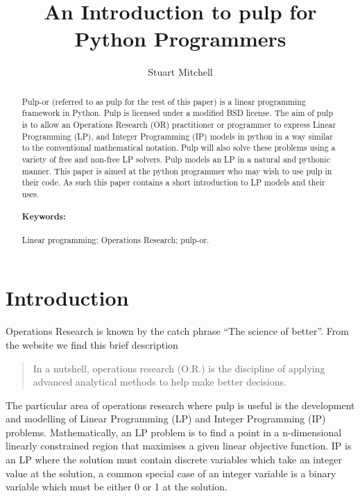 \documentclass[a4paper,oneside]{arlimsTPPM}
\title{An Introduction to pulp for Python Programmers}
\author{Stuart Mitchell}
\institute{
\begin{minipage}[t]{.45\textwidth}\centering
Light Metals Research Centre\\
University of Auckland\\
Auckland, New Zealand\\
\textnormal{\texttt{\small s.mitchell@auckland.ac.nz}}
\end{minipage}}
\begin{document}
\maketitle

\begin{abstract}
  Pulp-or (referred to as pulp for the rest of this paper) is a linear programming framework in Python. Pulp is licensed under a modified BSD license. The aim of pulp is to allow an Operations Research (OR) practitioner or programmer to express Linear Programming (LP), and Integer Programming (IP) models in python in a way similar to the conventional mathematical notation. Pulp 
  will also solve these problems using a variety of free and non-free LP solvers. Pulp models an LP in a natural and pythonic manner.
This paper is aimed at the python programmer who may wish to use pulp in their code. As such this paper contains a short introduction to LP models and their uses.

  \paragraph{Keywords:} Linear programming; Operations Research; pulp-or.
\end{abstract}

\section{Introduction}

Operations Research is known by the catch phrase ``The science of better''. From the website \cite{scienceofbetter} we find this brief description

\begin{quote}
In a nutshell, operations research (O.R.) is the discipline of applying advanced analytical methods to help make better decisions. 
\end{quote}

The particular area of operations research where pulp is useful is the development and modelling of Linear Programming (LP) and Integer Programming (IP) problems. Mathematically, an LP problem is to find a point in a n-dimensional linearly constrained region that maximises a given linear objective function. IP is an LP where the solution must contain discrete variables which take an integer value at the solution, a common special case of an integer variable is a binary variable which must be either 0 or 1 at the solution.
\end{document}
